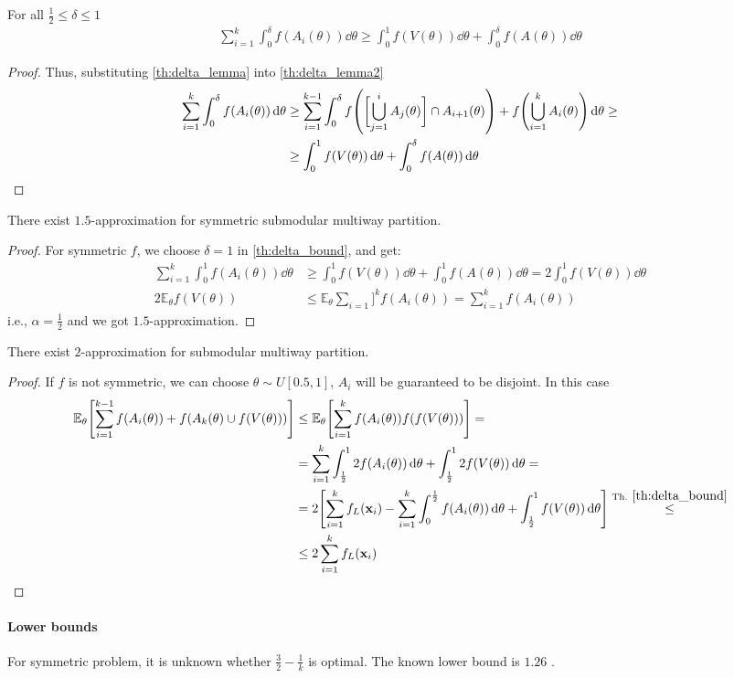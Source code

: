 \begin{theorem} \label{th:delta_bound}
	For all $\frac{1}{2} \leq \delta \leq 1$
	\begin{align}
	\sum_{i=1}^k \int_0^\delta f(A_i(\theta)) \dd{\theta} \geq \int_0^1 f(V(\theta)) \dd{\theta} + \int_0^\delta f(A(\theta))\dd{\theta}
	\end{align}
	\begin{proof}
		Thus, substituting \vref{th:delta_lemma} into \vref{th:delta_lemma2}
		\begin{align}
		\sum_{i=1}^k \int_0^\delta f(A_i(\theta)) \dd{\theta} &\geq \sum_{i=1}^{k-1} \int_0^\delta f\qty(\qty\bigg[ \bigcup_{j=1}^{i} A_j(\theta)] \cap A_{i+1}(\theta))  +  f\qty(\bigcup_{i=1}^k A_i(\theta) )\dd{\theta}  \geq\\&\geq \int_0^1 f(V(\theta)) \dd{\theta} + \int_0^\delta f\qty(A(\theta) ) \dd{\theta}
		\end{align}
	\end{proof}
\end{theorem}
\begin{theorem}
	There exist $1.5$-approximation for symmetric submodular multiway partition.
	\begin{proof}
	For symmetric $f$, we choose $\delta = 1$ in \cref{th:delta_bound}, and get:
	\begin{align}
	\sum_{i=1}^k \int_0^1 f(A_i(\theta)) \dd{\theta} &\geq \int_0^1 f(V(\theta)) \dd{\theta} + \int_0^1 f(A(\theta))\dd{\theta} = 2\int_0^1 f(V(\theta)) \dd{\theta}\\ 
	2\mathbb{E}_\theta f(V(\theta)) &\leq  \mathbb{E}_\theta  \sum_{i=1}]^k  f(A_i(\theta)) =  \sum_{i=1}^{k} f(A_i(\theta))  
	\end{align}
	i.e., $\alpha = \frac{1}{2}$ and we got $1.5$-approximation.
	\end{proof}
\end{theorem}

\begin{theorem}
	There exist $2$-approximation for submodular multiway partition.
		\begin{proof}
If $f$ is not symmetric, we can choose $\theta\sim U[0.5,1]$, $A_i$ will be guaranteed to be disjoint. In this case
\begin{align}
\mathbb{E}_\theta \qty[\sum_{i=1}^{k-1} f(A_i(\theta)) + f(A_k(\theta) \cup f(V(\theta))) ] &\leq\mathbb{E}_\theta \qty[\sum_{i=1}^{k} f(A_i(\theta))  f(f(V(\theta))) ] =\\&= \sum_{i=1}^k \int_{\frac{1}{2}}^{1} 2 f(A_i(\theta))\dd{\theta} + \int_{\frac{1}{2}}^{1} 2 f(V(\theta)) \dd{\theta}  =\\&=
 2\qty[\sum_{i=1}^k f_L(\vb{x}_i) - \sum_{i=1}^k \int_0^{\frac{1}{2}}  f(A_i(\theta))\dd{\theta} + \int_{\frac{1}{2}}^{1}  f(V(\theta)) \dd{\theta}] \stackrel{\text{Th. }\ref{th:delta_bound}}{\leq}\\&\leq 2 \sum_{i=1}^k f_L(\vb{x}_i)
\end{align}	\end{proof}
\end{theorem}

\paragraph{Lower bounds} For symmetric problem, it is unknown whether $\frac{3}{2} - \frac{1}{k}$ is optimal. The known lower bound is $1.26$ \cite{ene2013local}.

